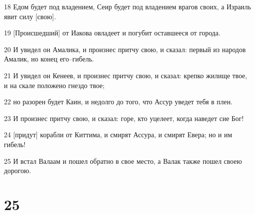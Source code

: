 \par 18 Едом будет под владением, Сеир будет под владением врагов своих, а Израиль явит силу [свою].
\par 19 [Происшедший] от Иакова овладеет и погубит оставшееся от города.
\par 20 И увидел он Амалика, и произнес притчу свою, и сказал: первый из народов Амалик, но конец его--гибель.
\par 21 И увидел он Кенеев, и произнес притчу свою, и сказал: крепко жилище твое, и на скале положено гнездо твое;
\par 22 но разорен будет Каин, и недолго до того, что Ассур уведет тебя в плен.
\par 23 И произнес притчу свою, и сказал: горе, кто уцелеет, когда наведет сие Бог!
\par 24 [придут] корабли от Киттима, и смирят Ассура, и смирят Евера; но и им гибель!
\par 25 И встал Валаам и пошел обратно в свое место, а Валак также пошел своею дорогою.

\chapter{25}

